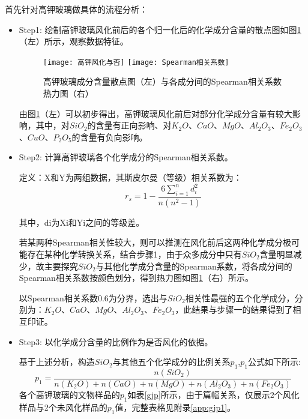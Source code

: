 \documentclass[withoutpreface,bwprint]{cumcmthesis} %
\begin{document}
首先针对高钾玻璃做具体的流程分析：
\begin{itemize}
	\item Step1: 绘制高钾玻璃风化前后的各个归一化后的化学成分含量的散点图如图\ref{gjfh}（左）所示，观察数据特征。
	
	\begin{figure}[!h]
		\centering
		\texttt{[image: 高钾风化与否]}
		\texttt{[image: Spearman相关系数]}
		\caption{高钾玻璃成分含量散点图（左）与各成分间的Spearman相关系数热力图（右）}
		\label{gjfh}
	\end{figure}
	
	由图\ref{gjfh}（左）可以初步得出，高钾玻璃风化前后对部分化学成分含量有较大影响，其中，对$SiO_{2}$的含量有正向影响、对$K_{2}O$、$CaO$、$MgO$、$Al_{2}O_{3}$、$Fe_{2}O_{3}$、$CuO$、$P_{2}O_{5}$的含量有负向影响。
	
	\item Step2: 计算高钾玻璃各个化学成分的Spearman相关系数。
	
	 定义：X和Y为两组数据，其斯皮尔曼（等级）相关系数为：
	 \[
	 r_{s}=1-\frac{6 \sum_{i=1}^{n} d_{i}^{2}}{n\left(n^{2}-1\right)}
	 \]
	
	 其中，di为Xi和Yi之间的等级差。
	
	若某两种Spearman相关性较大，则可以推测在风化前后这两种化学成分极可能存在某种化学转换关系，结合步骤1，由于众多成分中只有$SiO_{2}$含量明显减少，故主要探究$SiO_{2}$与其他化学成分含量的Spearman系数，将各成分间的Spearman相关系数按颜色划分，得到热力图如图\ref{gjfh}（右）所示。
	
	
以Spearman相关系数0.6为分界，选出与$SiO_{2}$相关性最强的五个化学成分，分别为：$K_{2}O$、$CaO$、$MgO$、$Al_{2}O_{3}$、$Fe_{2}O_{3}$，此结果与步骤一的结果得到了相互印证。
	
	
	\item Step3: 以化学成分含量的比例作为是否风化的依据。
	
	 基于上述分析，构造$SiO_{2}$与其他五个化学成分的比例关系$p_{1}$,$p_{1}$公式如下所示: $$p_{1}=\frac{n(SiO_{2})}{n(K_{2}O)+n(CaO)+n(MgO)+n(Al_{2}O_{3})+n(Fe_{2}O_{3})}$$ 各个高钾玻璃的文物样品的$p_{1}$如表\ref{gjp}所示，由于篇幅关系，仅展示2个风化样品与2个未风化样品的$p_{1}$值，完整表格见附录\ref{app:gjp1}。
	

\end{itemize}
\end{document}

